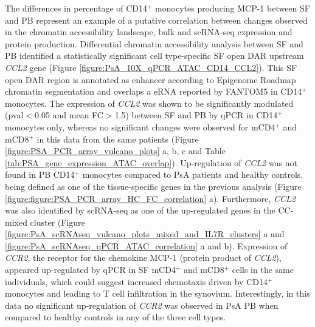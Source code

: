 The differences in percentage of CD14$^+$ monocytes producing MCP-1 between SF and PB represent an example of a putative correlation between changes observed in the chromatin accessibility landscape, bulk and scRNA-seq expression and protein production. Differential chromatin accessibility analysis between SF and PB identified a statistically significant cell type-specific SF open DAR upstream \textit{CCL2} gene (Figure \ref{figure:PsA_10X_qPCR_ATAC_CD14_CCL2}). This SF open DAR region is annotated as enhancer according to Epigenome Roadmap chromatin segmentation and overlaps a eRNA reported by FANTOM5 in CD14$^+$ monocytes. The expression of \textit{CCL2} was shown to be significantly modulated (pval$<$0.05 and mean FC$>$1.5) between SF and PB by qPCR in CD14$^+$ monocytes only, whereas no significant changes were observed for mCD4$^+$ and mCD8$^+$ in this data from the same patients (Figure \ref{figure:PSA_PCR_array_vulcano_plots} a, b, c and Table \ref{tab:PSA_gene_expression_ATAC_overlap}). Up-regulation of \textit{CCL2} was not found in PB CD14$^+$ monocytes compared to PsA patients and healthy controls, being defined as one of the tissue-specific genes in the previous analysis (Figure \ref{figure:figure:PSA_PCR_array_HC_FC_correlation} a).  Furthermore, \textit{CCL2} was also identified by scRNA-seq as one of the up-regulated genes in the CC-mixed cluster (Figure \ref{figure:PsA_scRNAseq_vulcano_plots_mixed_and_IL7R_clusters} a and \ref{figure:PsA_scRNAseq_qPCR_ATAC_correlation} a and b). Expression of \textit{CCR2}, the receptor for the chemokine MCP-1 (protein product of \textit{CCL2}), appeared up-regulated by qPCR in SF mCD4$^+$ and mCD8$^+$ cells in the same individuals, which could suggest increased chemotaxis driven by CD14$^+$ monocytes and leading to T cell infiltration in the synovium. Interestingly, in this data no significant up-regulation of \textit{CCR2} was observed in PsA PB when compared to healthy controls in any of the three cell types.   



